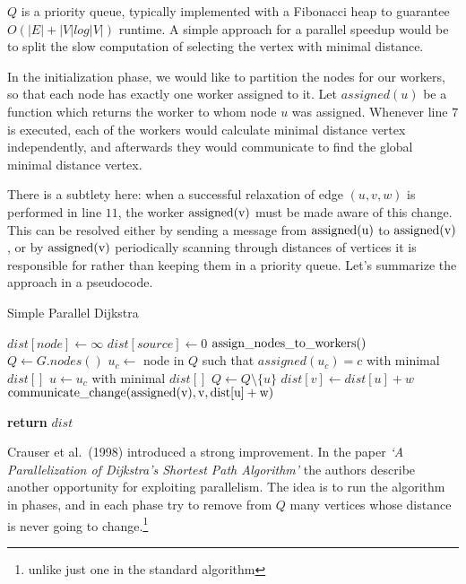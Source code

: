 \documentclass[12pt,a4paper,oneside,openright]{report}
\begin{document}
$Q$ is a priority queue, typically implemented with a Fibonacci heap to guarantee $O(|E| + |V| log |V|)$ runtime. A simple approach for a parallel speedup would be to split the slow computation of selecting the vertex with minimal distance. 

In the initialization phase, we would like to partition the nodes for our workers, so that each node has exactly one worker assigned to it. Let $assigned(u)$ be a function which returns the worker to whom node $u$ was assigned. Whenever line $7$ is executed, each of the workers would calculate minimal distance vertex independently, and afterwards they would communicate to find the global minimal distance vertex.

There is a subtlety here: when a successful relaxation of edge $(u,v,w)$ is performed in line $11$, the worker $\rm{assigned(v)}$ must be made aware of this change. This can be resolved either by sending a message from $\rm{assigned(u)}$ to $\rm{assigned(v)}$, or by $\rm{assigned(v)}$ periodically scanning through distances of vertices it is responsible for rather than keeping them in a priority queue. Let's summarize the approach in a pseudocode.

\begin{algorithm}
\caption{Simple Parallel Dijkstra}\label{pdijkstra}
\begin{algorithmic}[1]
    \State $dist[node] \gets \infty$
\EndFor
\State $dist[source] \gets 0$
\State $\rm{assign\_nodes\_to\_workers()}$
\State $Q \gets G.nodes()$
        \State $u_c \gets$ node in $Q$ such that $assigned(u_c) = c$ with minimal $dist[]$
        \EndFor
        \State $u \gets u_c$ with minimal $dist[]$
        \State $Q \gets Q \setminus \{u\}$
            \State $dist[v] \gets dist[u] + w$
            \State $\rm{communicate\_change(assigned(v)}, v, dist[u] + w)$
        \EndIf
      \EndFor
    \EndWhile
    
    
\State \textbf{return} $dist$
\EndProcedure
\end{algorithmic}
\end{algorithm}

Crauser et al.~(1998) \cite{dijkstra} introduced a strong improvement. In the paper \textit{`A Parallelization of Dijkstra's Shortest Path Algorithm'} the authors describe another opportunity for exploiting parallelism. The idea is to run the algorithm in phases, and in each phase try to remove from $Q$ many vertices whose distance is never going to change.\footnote{unlike just one in the standard algorithm}
\end{document}
